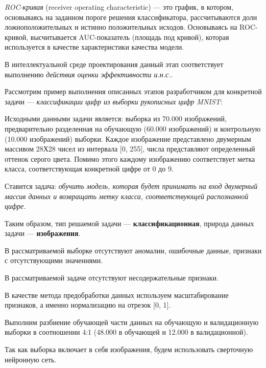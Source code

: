 \textit{ROC-кривая} (receiver operating characteristic) --- это график, в котором, основываясь на заданном пороге решения классификатора, рассчитываются доли ложноположительных и истинно положительных исходов. Основываясь на ROC-кривой, высчитывается AUC-показатель (площадь под кривой), которая используется в качестве характеристики качества модели.

В интеллектуальной среде проектирования данный этап соответствует выполнению \textit{действия оценки эффективности и.н.с.}.

Рассмотрим пример выполнения описанных этапов разработчиком для конкретной задачи --- \textit{классификации цифр из выборки рукописных цифр MNIST}:

\begin{textitemize}
\item Исходными данными задачи является: выборка из 70.000 изображений, предварительно разделенная на обучающую (60.000 изображений) и контрольную (10.000 изображений) выборки. Каждое изображение представлено двумерным массивом 28Х28 чисел из интервала [0, 255], числа представляют определенный оттенок серого цвета. Помимо этого каждому изображению соответствует метка класса, соответствующая конкретной цифре от 0 до 9.

Ставится задача: \textit{обучить модель, которая будет принимать на вход двумерный массив данных и возвращать метку класса, соответствующей распознанной цифре.}

Таким образом, тип решаемой задачи --- \textbf{классификационная}, природа данных задачи --- \textbf{изображения}.

\item В рассматриваемой выборке отсутствуют аномалии, ошибочные данные, признаки с отсутствующими значениями.

\item В рассматриваемой задаче отсутствуют несодержательные признаки.

\item В качестве метода предобработки данных используем масштабирование признаков, а именно нормализацию на отрезок [0, 1].

\item Выполним разбиение обучающей части данных на обучающую и валидационную выборки в соотношении 4:1 (48.000 в обучающей и 12.000 в валидационной).

\item Так как выборка включает в себя изображения, будем использовать сверточную нейронную сеть.


\end{textitemize}
